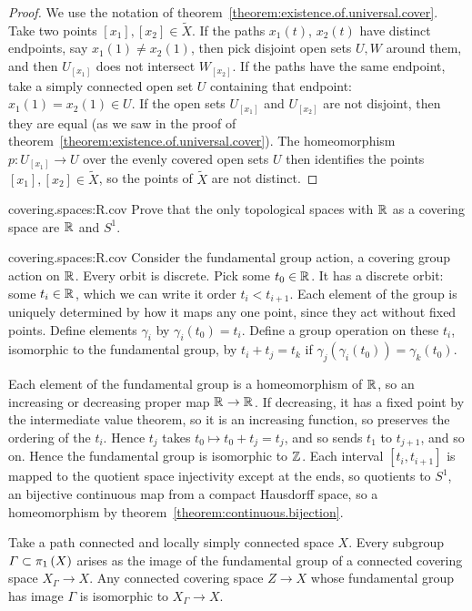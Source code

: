 \begin{proof}
We use the notation of theorem~\vref{theorem:existence.of.universal.cover}.
Take two points \(\left[x_1\right], \left[x_2\right] \in \tilde{X}\).
If the paths \(x_1(t)\), \(x_2(t)\) have distinct endpoints, say \(x_1(1) \ne x_2(1)\), then pick disjoint open sets \(U, W\) around them, and then \(U_{[x_1]}\) does not intersect \(W_{[x_2]}\).
If the paths have the same endpoint, take a simply connected open set \(U\) containing that endpoint: \(x_1(1)=x_2(1) \in U\).
If the open sets \(U_{[x_1]}\) and \(U_{[x_2]}\) are not disjoint, then they are equal (as we saw in the proof of theorem~\ref{theorem:existence.of.universal.cover}).
The homeomorphism \(p \colon U_{[x_1]} \to U\) over the evenly covered open sets \(U\) then identifies the points \([x_1], [x_2] \in \tilde{X}\), so the points of \(\tilde{X}\) are not distinct.
\end{proof}
\begin{problem}{covering.spaces:R.cov}
Prove that the only topological spaces with \(\mathbb{R}^{}\) as a covering space are \(\mathbb{R}^{}\) and \(S^1\).
\end{problem}
\begin{answer}{covering.spaces:R.cov}
Consider the fundamental group action, a covering group action on \(\mathbb{R}^{}\).
Every orbit is discrete.
Pick some \(t_0\in\mathbb{R}^{}\).
It has a discrete orbit: some \(t_i\in\mathbb{R}^{}\), which we can write it order \(t_i<t_{i+1}\).
Each element of the group is uniquely determined by how it maps any one point, since they act without fixed points.
Define elements \(\gamma_i\) by \(\gamma_i(t_0)=t_i\).
Define a group operation on these \(t_i\), isomorphic to the fundamental group, by \(t_i+t_j=t_k\) if \(\gamma_j(\gamma_i(t_0))=\gamma_k(t_0)\).

Each element of the fundamental group is a homeomorphism of \(\mathbb{R}^{}\), so an increasing or decreasing proper map \(\mathbb{R}^{}\to\mathbb{R}^{}\).
If decreasing, it has a fixed point by the intermediate value theorem, so it is an increasing function, so preserves the ordering of the \(t_i\).
Hence \(t_j\) takes \(t_0\mapsto t_0+t_j=t_j\), and so sends \(t_1\) to \(t_{j+1}\), and so on.
Hence the fundamental group is isomorphic to \(\mathbb{Z}^{}\).
Each interval \([t_i,t_{i+1}]\) is mapped to the quotient space injectivity except at the ends, so quotients to \(S^1\), an bijective continuous map from a compact Hausdorff space, so a homeomorphism by theorem~\vref{theorem:continuous.bijection}.
\end{answer}
\begin{lemma}\label{lemma:covering.spaces.and.groups}
Take a path connected and locally simply connected space \(X\).
Every subgroup \(\Gamma \subset \pi_{1}\left(X\right)\) arises as the image of the fundamental group of a connected covering space \(X_{\Gamma} \to X\).
Any connected covering space \(Z \to X\) whose fundamental group has image \(\Gamma\) is isomorphic to \(X_{\Gamma} \to X\).
\end{lemma}
